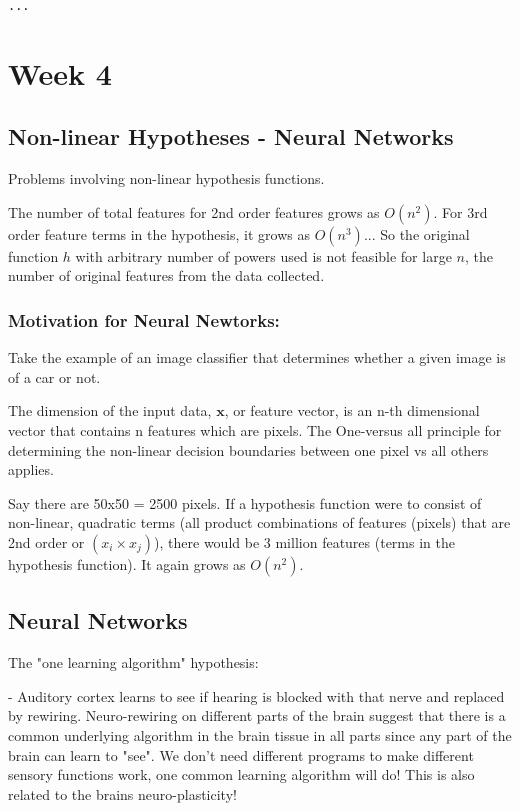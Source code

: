 \documentclass{article}
\begin{document}
\begin{verbatim}
...
\end{verbatim}






\section{Week 4}

\subsection{Non-linear Hypotheses - Neural Networks}

Problems involving non-linear hypothesis functions.


The number of total features for 2nd order features grows as $O(n^2)$. For 3rd order feature terms in the hypothesis, it grows as $O(n^3)$... So the original function $h$ with arbitrary number of powers used is not feasible for large $n$, the number of original features from the data collected.


\subsubsection{Motivation for Neural Newtorks:}

Take the example of an image classifier that determines whether a given image is of a car or not.

The dimension of the input data, $\textbf{x}$, or feature vector, is an n-th dimensional vector that contains n features which are pixels. The One-versus all principle for determining the non-linear decision boundaries between one pixel vs all others applies.

Say there are 50x50 = 2500 pixels. If a hypothesis function were to consist of non-linear, quadratic terms (all product combinations of features (pixels) that are 2nd order or $(x_i \times x_j)$), there would be 3 million features (terms in the hypothesis function). It again grows as $O(n^2)$.


\subsection{Neural Networks}

The "one learning algorithm" hypothesis:

- Auditory cortex learns to see if hearing is blocked with that nerve and replaced by rewiring. Neuro-rewiring on different parts of the brain suggest that there is a common underlying algorithm in the brain tissue in all parts since any part of the brain can learn to "see". We don't need different programs to make different sensory functions work, one common learning algorithm will do! This is also related to the brains neuro-plasticity!
\end{document}
